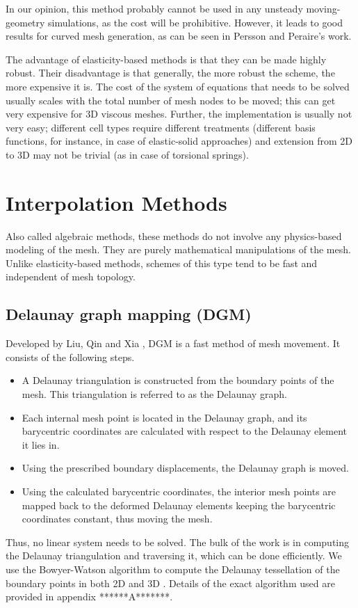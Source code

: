  In our opinion, this method probably cannot be used in any unsteady moving-geometry simulations, as the cost will be prohibitive. However, it leads to good results for curved mesh generation, as can be seen in Persson and Peraire's work.
 
 The advantage of elasticity-based methods is that they can be made highly robust. Their disadvantage is that generally, the more robust the scheme, the more expensive it is. The cost of the system of equations that needs to be solved usually scales with the total number of mesh nodes to be moved; this can get very expensive for 3D viscous meshes. Further, the implementation is usually not very easy; different cell types require different treatments (different basis functions, for instance, in case of elastic-solid approaches) and extension from 2D to 3D may not be trivial (as in case of torsional springs).
 
 \section{Interpolation  Methods}
 Also called algebraic methods, these methods do not involve any physics-based modeling of the mesh. They are purely mathematical manipulations of the mesh. Unlike elasticity-based methods, schemes of this type tend to be fast and independent of mesh topology. 
 
 \subsection{Delaunay graph mapping (DGM)}
 \label{sec:dgm}
 Developed by Liu, Qin and Xia \cite{mm:dgm}, DGM is a fast method of mesh movement. It consists of the following steps.
 \begin{itemize}
 	\item A Delaunay triangulation is constructed from the boundary points of the mesh. This triangulation is referred to as the Delaunay graph.
 	\item Each internal mesh point is located in the Delaunay graph, and its barycentric coordinates are calculated with respect to the Delaunay element it lies in.
 	\item Using the prescribed boundary displacements, the Delaunay graph is moved.
 	\item Using the calculated barycentric coordinates, the interior mesh points are mapped back to the deformed Delaunay elements keeping the barycentric coordinates constant, thus moving the mesh.
 \end{itemize}
 Thus, no linear system needs to be solved. The bulk of the work is in computing the Delaunay triangulation and traversing it, which can be done efficiently. We use the Bowyer-Watson algorithm to compute the Delaunay tessellation of the boundary points in both 2D and 3D \cite{bowyer}. Details of the exact algorithm used are provided in appendix ******A*******.
 
